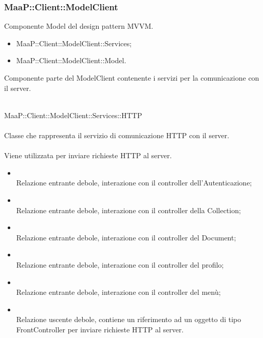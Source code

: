 \subsubsection{MaaP::Client::ModelClient}
Componente Model del design pattern MVVM.
\begin{itemize}
\item MaaP::Client::ModelClient::Services;
\item MaaP::Client::ModelClient::Model.
\end{itemize}

Componente parte del ModelClient contenente i servizi per la comunicazione con il server.

\\
MaaP::Client::ModelClient::Services::HTTP\\
\\
Classe che rappresenta il servizio di comunicazione HTTP con il server.\\
\\
Viene utilizzata per inviare richieste HTTP al server.\\
\begin{itemize}
\item{}\\
Relazione entrante debole, interazione con il controller dell'Autenticazione;
\item{}\\
Relazione entrante debole, interazione con il controller della Collection;
\item{}\\
Relazione entrante debole, interazione con il controller del Document;
\item{}\\
Relazione entrante debole, interazione con il controller del profilo;
\item{}\\
Relazione entrante debole, interazione con il controller del menù;
\item{}\\
Relazione uscente debole, contiene un riferimento ad un oggetto di tipo FrontController per inviare richieste HTTP al server.
\end{itemize}

